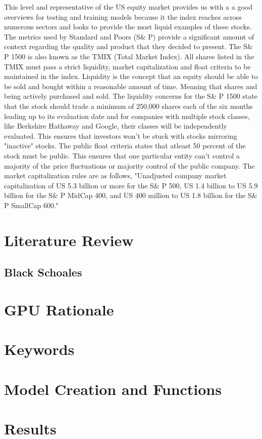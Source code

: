 \documentclass[paper=letter, fontsize=11pt]{scrartcl}
\numberwithin{equation}{section}		%
\numberwithin{figure}{section}			%
\numberwithin{table}{section}				%
\begin{document}
\begin{spacing}{2}
This level and representative of the US equity market provides us with a a good overviews for testing and training models because it the index reaches across numerous sectors and looks to provide the most liquid examples of these stocks. The metrics used by Standard and Poors (S\& P) provide a significant amount of context regarding the quality and product that they decided to present. The S\& P 1500 is also known as the TMIX (Total Market Index). All shares listed in the TMIX must pass a strict liquidity, market capitalization and float criteria to be maintained in the index. Liquidity is the concept that an equity should be able to be sold and bought within a reasonable amount of time. Meaning that shares and being actively purchased and sold. The liquidity concerns for the S\& P 1500 state that the stock should trade a minimum of 250,000 shares each of the six months leading up to its evaluation date and for companies with multiple stock classes, like Berkshire Hathaway and Google, their classes will be independently evaluated. This ensures that investors won't be stuck with stocks mirroring "inactive" stocks. The public float criteria states that atleast 50 percent of the stock must be public. This ensures that one particular entity can't control a majority of the price fluctuations or majority control of the public company. The market capitalization rules are as follows, "Unadjusted company market capitalization of US 5.3 billion or more for the S\& P 500, US 1.4 billion to US 5.9 billion for the  S\& P MidCap 400, and US 400 million to US 1.8 billion for the S\& P SmallCap 600." \cite{Methodology}


\section{Literature Review}
\subsection{Black Schoales}
\section{GPU Rationale}
\section{Keywords}
\section{Model Creation and Functions}
\section{Results}





\end{spacing}

 
\end{document}

